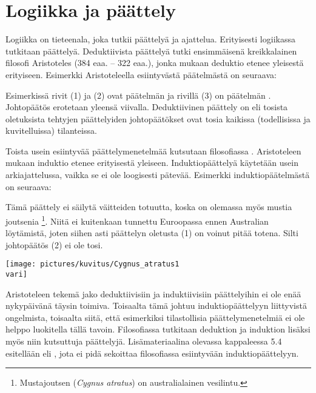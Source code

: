 \chapter{Logiikka ja päättely}

Logiikka on tieteenala, joka tutkii päättelyä ja ajattelua.
Erityisesti logiikassa tutkitaan  päättelyä.
Deduktiivista päättelyä tutki ensimmäisenä kreikkalainen filosofi Aristoteles (384 eaa. -- 322 eaa.),
jonka mukaan deduktio etenee yleisestä erityiseen.
Esimerkki Aristoteleella esiintyvästä pää\-tel\-mäs\-tä on seuraava:

\bigskip
\begin{center}
\end{center}
\bigskip

Esimerkissä rivit (1) ja (2) ovat päätelmän  ja
rivillä (3) on päätelmän .
Johtopäätös erotetaan yleensä viivalla.
Deduktiivinen päättely on  eli
tosista oletuksista tehtyjen päättelyiden johtopäätökset ovat tosia kaikissa
(todellisissa ja kuvitelluissa) tilanteissa.

Toista usein esiintyvää päättelymenetelmää kutsutaan filosofiassa
.
Aristoteleen mukaan induktio etenee erityisestä yleiseen.
Induktiopäättelyä käytetään usein arkiajattelussa, vaikka se ei
ole loogisesti pätevää.
Esimerkki induktiopäätelmästä on seuraava:

\bigskip
\begin{center}
\end{center}
\bigskip

Tämä päättely ei säilytä väitteiden totuutta, koska on olemassa myös mustia joutsenia
\footnote{Mustajoutsen ({\it Cygnus atratus}) on australialainen vesilintu.}.
Niitä ei kuitenkaan tunnettu Euroopassa ennen Australian löytämistä, joten
siihen asti päättelyn oletusta (1) on voinut pitää totena.
Silti johtopäätös (2) ei ole tosi.

\bigskip
\begin{center}
    \texttt{[image: pictures/kuvitus/Cygnus\_atratus1\\vari]}
\end{center}
\bigskip

Aristoteleen tekemä jako deduktiivisiin ja induktiivisiin päättelyihin
ei ole enää nykypäivänä täysin toimiva.
Toisaalta tämä johtuu induktiopäättelyyn liittyvistä ongelmista,
toisaalta siitä, että esimerkiksi tilastollisia päättelymenetelmiä
ei ole helppo luokitella tällä tavoin.
Filosofiassa tutkitaan deduktion ja induktion lisäksi myös niin kutsuttuja
 päättelyjä.
Lisämateriaalina olevassa kappaleessa 5.4 esitellään
 eli
,
jota ei pidä sekoittaa filosofiassa esiintyvään induktiopäättelyyn.

